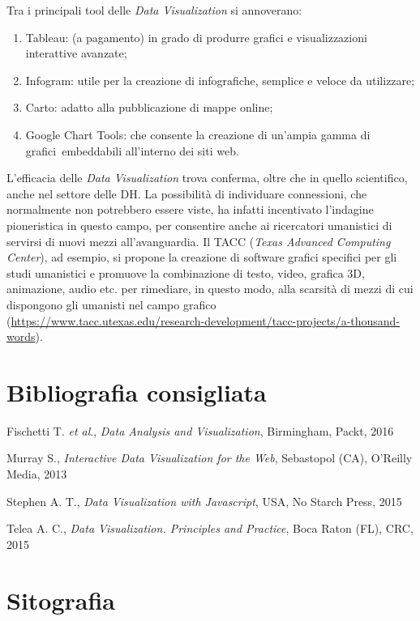 \documentclass[
  b5paper,
  twoside,
  12pt,
  chapterprefix=false,
  bibliography=totocnumbered,
  parskip=false]{scrbook}
\begin{document}
Tra i principali tool delle \emph{Data Visualization} si annoverano:

\begin{enumerate}
\def\labelenumi{\arabic{enumi}.}
\item
  Tableau: (a pagamento) in grado di produrre grafici e
  visualizzazioni interattive avanzate;
\item
  Infogram: utile per la creazione di infografiche, semplice e veloce
  da utilizzare;
\item
  Carto: adatto alla pubblicazione di mappe online;
\item
  Google Chart Tools: che consente la creazione di un'ampia gamma di
  grafici~embeddabili all'interno dei siti web.
\end{enumerate}

L'efficacia delle \emph{Data Visualization} trova conferma, oltre che in
quello scientifico, anche nel settore delle DH. La possibilità di
individuare connessioni, che normalmente non potrebbero essere viste, ha
infatti incentivato l'indagine pioneristica in questo campo, per
consentire anche ai ricercatori umanistici di servirsi di nuovi mezzi
all'avanguardia. Il TACC (\emph{Texas Advanced Computing Center}), ad
esempio, si propone la creazione di software grafici specifici per gli
studi umanistici e promuove la combinazione di testo, video, grafica 3D,
animazione, audio etc. per rimediare, in questo modo, alla scarsità di
mezzi di cui dispongono gli umanisti nel campo grafico
(\url{https://www.tacc.utexas.edu/research-development/tacc-projects/a-thousand-words}).

\hypertarget{bibliografia-consigliata-5}{%
\section*{Bibliografia consigliata}\label{bibliografia-consigliata-5}}

Fischetti T. \emph{et al}., \emph{Data Analysis and Visualization}, Birmingham,
Packt, 2016

Murray S., \emph{Interactive Data Visualization for the Web}, Sebastopol
(CA), O'Reilly Media, 2013

Stephen A. T., \emph{Data Visualization with Javascript}, USA, No Starch
Press, 2015

Telea A. C., \emph{Data Visualization. Principles and Practice}, Boca Raton
(FL), CRC, 2015

\hypertarget{sitografia-7}{%
\section*{Sitografia}\label{sitografia-7}}
\end{document}
